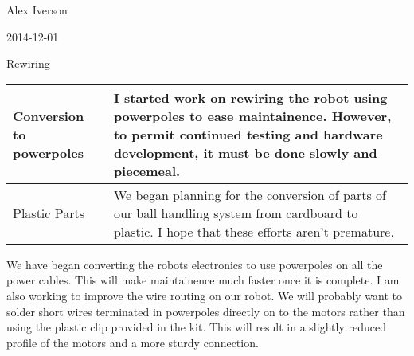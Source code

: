 Alex Iverson

2014-12-01

Rewiring

\begin{tabular}{|p{5cm}|p{5cm}|}
 \hline
 Conversion to powerpoles&
 I started work on rewiring the robot using powerpoles to ease maintainence. However, to permit continued testing and hardware development, it must be done slowly and piecemeal.\\
 \hline
 Plastic Parts&
 We began planning for the conversion of parts of our ball handling system from cardboard to plastic. I hope that these efforts aren't premature.\\
 \hline
\end{tabular}

We have began converting the robots electronics to use powerpoles on all the power cables. This will make maintainence much faster once it is complete. I am also working to improve the wire routing on our robot. We will probably want to solder short wires terminated in powerpoles directly on to the motors rather than using the plastic clip provided in the kit. This will result in a slightly reduced profile of the motors and a more sturdy connection.